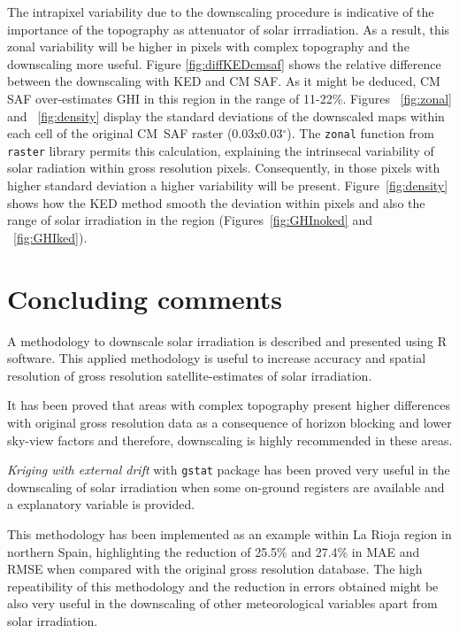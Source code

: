 \documentclass[authoryear, sort&compress]{elsarticle}
\begin{document}
The intrapixel variability due to the downscaling procedure is
indicative of the importance of the topography as attenuator of solar
irrradiation. As a result, this zonal variability will be higher in
pixels with complex topography and the downscaling more useful. Figure \ref{fig:diffKEDcmsaf} shows the relative difference between the downscaling with KED and CM SAF. As it might be deduced, CM SAF over-estimates GHI in this region in the range of 11-22\%.
Figures ~\ref{fig:zonal} and ~\ref{fig:density}  display the standard
deviations of the downscaled maps within each cell of the original
CM~SAF raster (0.03x0.03$^\circ$). The \texttt{zonal} function from
\texttt{raster} library permits this calculation, explaining the
intrinsecal variability of solar radiation within gross resolution
pixels. Consequently, in those pixels with higher standard deviation a
higher variability will be present.  Figure~\ref{fig:density} shows how
the KED method smooth the deviation within pixels and also the range
of solar irradiation in the region (Figures~\ref{fig:GHInoked} and
~\ref{fig:GHIked}).



\section{Concluding comments}
A methodology to downscale solar irradiation is described and
presented using R software. This applied methodology is
useful to increase accuracy and spatial resolution of gross resolution
satellite-estimates of solar irradiation.

It has been proved that areas with complex topography present higher
differences with original gross resolution data as a consequence of
horizon blocking and lower sky-view factors and therefore, downscaling
is highly recommended in these areas. 

\emph{Kriging with external drift} with \texttt{gstat} package has been
proved very useful in the downscaling of solar irradiation when some
on-ground registers are available and a explanatory variable is
provided.
  
This methodology has been implemented as an example within La Rioja
region in northern Spain, highlighting  the reduction of 25.5\% and 27.4\% in MAE and RMSE
when compared with the original gross resolution database. The high
repeatibility of this methodology and the reduction in errors obtained might be also very useful in the
downscaling of other meteorological variables apart from solar
irradiation.
\end{document}
